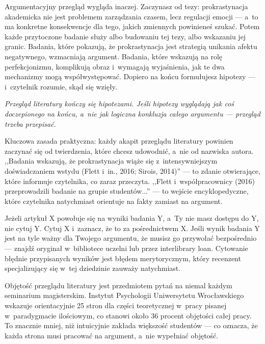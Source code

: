 \documentclass[12pt,a4paper,twoside,openany]{book}
\newcommand{\pullquote}[1]{%
  \par\vspace{12pt}\noindent
  \begin{tcolorbox}[blanker, breakable, left=2.2em, right=1em, top=2pt, bottom=2pt,
    borderline west={2.5pt}{0pt}{accent}]
    {\color{chaptercolor}\Large\itshape #1}
  \end{tcolorbox}\vspace{10pt}\par
}
\begin{document}
Argumentacyjny przegląd wygląda inaczej. Zaczynasz od tezy: prokrastynacja akademicka nie jest problemem zarządzania czasem, lecz regulacji emocji --- a~to ma konkretne konsekwencje dla tego, jakich zmiennych powinieneś szukać. Potem każde przytoczone badanie służy albo budowaniu tej tezy, albo wskazaniu jej granic. Badania, które pokazują, że prokrastynacja jest strategią unikania afektu negatywnego, wzmacniają argument. Badania, które wskazują na rolę perfekcjonizmu, komplikują obraz i~wymagają wyjaśnienia, jak te dwa mechanizmy mogą współwystępować. Dopiero na końcu formułujesz hipotezy --- i~czytelnik rozumie, skąd się wzięły.

\pullquote{Przegląd literatury kończy się hipotezami. Jeśli hipotezy wyglądają jak coś doczepionego na końcu, a~nie jak logiczna konkluzja całego argumentu --- przegląd trzeba przepisać.}

Kluczowa zasada praktyczna: każdy akapit przeglądu literatury powinien zaczynać się od twierdzenia, które chcesz udowodnić, a~nie od nazwiska autora. ,,Badania wskazują, że prokrastynacja wiąże się z~intensywniejszym doświadczaniem wstydu (Flett i~in., 2016; Sirois, 2014)'' --- to zdanie otwierające, które informuje czytelnika, co zaraz przeczyta. ,,Flett i~współpracownicy (2016) przeprowadzili badanie na grupie studentów...'' --- to wejście encyklopedyczne, które czytelnika natychmiast orientuje na fakty zamiast na argument.

\begin{warningbox}
Jeżeli artykuł X powołuje się na wyniki badania Y, a~Ty nie masz dostępu do Y, nie cytuj Y. Cytuj X i~zaznacz, że to za pośrednictwem X. Jeśli wynik badania Y jest na tyle ważny dla Twojego argumentu, że musisz go przywołać bezpośrednio --- znajdź oryginał w~bibliotece uczelni lub przez interlibrary loan. Cytowanie błędnie przypisanych wyników jest błędem merytorycznym, który recenzent specjalizujący się w~tej dziedzinie zauważy natychmiast.
\end{warningbox}

Objętość przeglądu literatury jest przedmiotem pytań na niemal każdym seminarium magisterskim. Instytut Psychologii Uniwersytetu Wrocławskiego wskazuje orientacyjnie 25 stron dla części teoretycznej w~pracy pisanej w~paradygmacie ilościowym, co stanowi około 36 procent objętości całej pracy. To znacznie mniej, niż intuicyjnie zakłada większość studentów --- co oznacza, że każda strona musi pracować na argument, a~nie wypełniać objętość.
\end{document}
